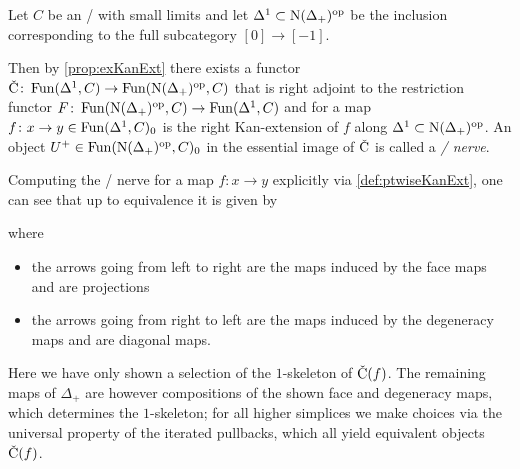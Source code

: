 \begin{definition}
    Let $C$ be an \inftycat/ with small limits and let $\Delta^1\subset\operatorname{N}(\Delta_+)^{\operatorname{op}}$ be the inclusion corresponding to the full subcategory $[0]\to[-1]$.
    
    Then by \cref{prop:exKanExt} there exists a functor $\CN\colon\Fun(\Delta^1,C)\to\Fun(\N(\Delta_+)^{\op},C)$ that is right adjoint to the restriction functor $F\colon\operatorname{Fun}(\operatorname{N}(\Delta_+)^{\operatorname{op}},C)\to\operatorname{Fun}(\Delta^1,C)$ and for a map $f\colon x\to y\in\operatorname{Fun}(\Delta^1,C)_0$ is the right Kan-extension of $f$ along $\Delta^1\subset\operatorname{N}(\Delta_+)^{\operatorname{op}}$.
    An object $U^+\in\operatorname{Fun}(\operatorname{N}(\Delta_+)^{\operatorname{op}},C)_0$ in the essential image of $\CN$ is called a \emph{\Cech/ nerve}.
\end{definition}
\begin{remark}\label{rmk:cechNerveExplicit}
    Computing the \Cech/ nerve for a map $f\colon x\to y$ explicitly via \cref{def:ptwiseKanExt}, one can see that up to equivalence it is given by
    \begin{center}
    \end{center}
    where
    \begin{itemize}
        \item the arrows going from left to right are the maps induced by the face maps and are projections 
        \item the arrows going from right to left are the maps induced by the degeneracy maps and are diagonal maps. 
    \end{itemize}
    Here we have only shown a selection of the $1$-skeleton of $\CN(f)$.
    The remaining maps of $\Delta_+$ are however compositions of the shown face and degeneracy maps, which determines the $1$-skeleton; for all higher simplices we make choices via the universal property of the iterated pullbacks, which all yield equivalent objects $\CN(f)$.
\end{remark}
